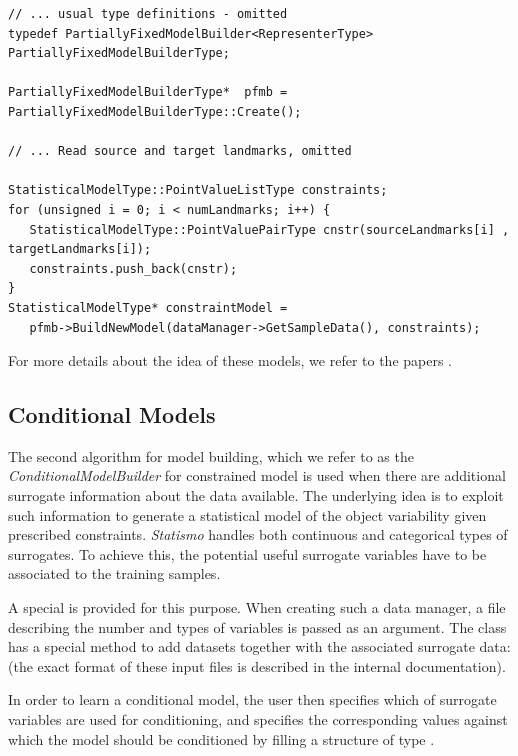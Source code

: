 \documentclass{InsightArticle}
\newcommand{\Statismo}{\emph{Statismo}\xspace}
\begin{document}
\begin{verbatim}
// ... usual type definitions - omitted
typedef PartiallyFixedModelBuilder<RepresenterType> PartiallyFixedModelBuilderType;

PartiallyFixedModelBuilderType*  pfmb = PartiallyFixedModelBuilderType::Create();

// ... Read source and target landmarks, omitted

StatisticalModelType::PointValueListType constraints;
for (unsigned i = 0; i < numLandmarks; i++) { 
   StatisticalModelType::PointValuePairType cnstr(sourceLandmarks[i] , targetLandmarks[i]);
   constraints.push_back(cnstr);
}
StatisticalModelType* constraintModel = 
   pfmb->BuildNewModel(dataManager->GetSampleData(), constraints);
\end{verbatim}

For more details about the idea of these models, we refer to the papers \cite{luthi_probabilistic_2009,luthi_using_2011}.

\subsection{Conditional Models}
The second algorithm for model building, which we refer to as the
\emph{ConditionalModelBuilder} for constrained model is used when
there are additional surrogate information about the data available.
The underlying idea is to exploit such information to generate a
statistical model of the object variability given prescribed
constraints. \Statismo handles both continuous and categorical types
of surrogates.  To achieve this, the potential useful surrogate
variables have to be associated to the training samples.

A special  is provided for this
purpose. When creating such a data manager, a file describing the
number and types of variables is passed as an argument.  The class has
a special method to add datasets together with the associated
surrogate data: 
(the exact format of these input files is described in the internal documentation).

In order to learn a conditional model, the user then specifies which
of surrogate variables are used for conditioning, and specifies the
corresponding values against which the model should be conditioned by
filling a structure of type .
\end{document}
